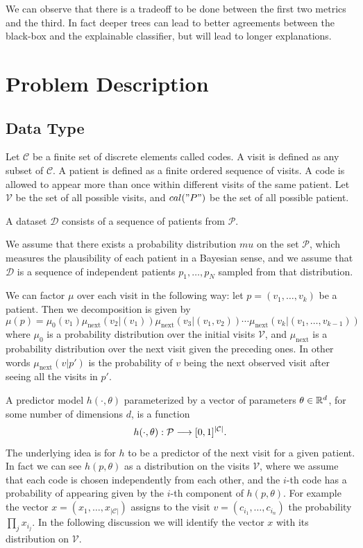 \documentclass[]{marticle}
\newcommand{\ds}{\mathcal{D}}
\newcommand{\codes}{\mathcal{C}}
\newcommand{\patients}{\mathcal{P}}
\newcommand{\visits}{\mathcal{V}}
\begin{document}
We can observe that there is a tradeoff to be done between the first two metrics and the third. In
fact deeper trees can lead to better agreements between the black-box and the explainable
classifier, but will lead to longer explanations.


\section{Problem Description}

\subsection{Data Type} \label{sect-datashape}

Let $\codes$ be a finite set of discrete elements called codes. A visit is defined as any subset
of $\codes$. A patient is defined as a finite ordered sequence of visits. A code is allowed to
appear more than once within different visits of the same patient. Let $\visits$ be the set of all
possible visits, and $cal("P")$ be the set of all possible patient.

A dataset $\ds$ consists of a sequence of patients from $\patients$.

We assume that there exists a probability distribution $mu$ on the set $\patients$, which measures
the plausibility of each patient in a Bayesian sense, and we assume that $\ds$ is a sequence of
independent patients $p_1, \dots, p_N$ sampled from that distribution.

We can factor $\mu$ over each visit in the following way: let $p=(v_1, \dots, v_k)$ be a patient. Then
we decomposition is given by
$$ \mu(p) = \mu_0(v_1) \mu_\text{next} (v_2 | (v_1)) \mu_\text{next} (v_3 |
    (v_1, v_2)) \cdots \mu_\text{next} (v_k | (v_1, \dots, v_{k-1})) $$
where $\mu_0$ is a probability distribution over the initial visits $\visits$, and $\mu_\text{next}$ is a
probability distribution over the next visit given the preceding ones. In other words $\mu_\text{next} (v
| p')$ is the probability of $v$ being the next observed visit after seeing all the visits in $p'$.

A predictor model $h(\cdot, \theta)$ parameterized by a vector of parameters $\theta \in \mathbb{R}^d$, for some
number of dimensions $d$, is a function
$$ h(\cdot, \theta) : \patients \arr [0,1]^{|\codes|}. $$
The underlying idea is for $h$ to be a predictor of the next visit for a given patient. In fact we
can see $h(p, \theta)$ as a distribution on the visits $\visits$, where we assume that each code is
chosen independently from each other, and the $i$-th code has a probability of appearing given by
the $i$-th component of $h(p, \theta)$. For example the vector $x=(x_1, \dots, x_{|\codes|})$ assigns
to the visit $v=(c_{i_1}, \dots, c_{i_n})$ the probability $\prod_j x_{i_j}$. In the following
discussion we will identify the vector $x$ with its distribution on $\visits$.
\end{document}
